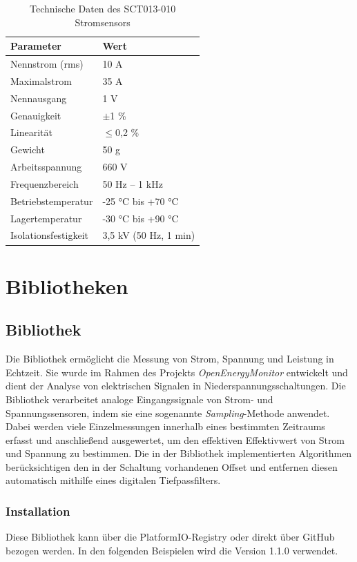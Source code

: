 \begin{table}[H]
	\centering
	\begin{tabular}{|l|l|}
		\hline
		\textbf{Parameter} & \textbf{Wert} \\
		\hline
		Nennstrom (rms) & 10 A \\
		\hline
		Maximalstrom & 35 A \\
		\hline
		Nennausgang & 1 V \\
		\hline
		Genauigkeit & $\pm$1 \% \\
		\hline
		Linearität & $\leq$0,2 \% \\
		\hline
		Gewicht & 50 g \\
		\hline
		Arbeitsspannung & 660 V \\
		\hline
		Frequenzbereich & 50 Hz – 1 kHz \\
		\hline
		Betriebstemperatur & -25 °C bis +70 °C \\
		\hline
		Lagertemperatur & -30 °C bis +90 °C \\
		\hline
		Isolationsfestigkeit & 3,5 kV (50 Hz, 1 min) \\
		\hline
	\end{tabular}
	\caption{Technische Daten des SCT013-010 Stromsensors \cite{YHDC:2017}}
	\label{tab:SCT013-Daten}
\end{table}


\section{Bibliotheken}
	\subsection{Bibliothek }
	Die Bibliothek  ermöglicht die Messung von Strom, Spannung und Leistung in Echtzeit. Sie wurde im Rahmen des Projekts \textit{OpenEnergyMonitor} entwickelt und dient der Analyse von elektrischen Signalen in Niederspannungsschaltungen. Die Bibliothek verarbeitet analoge Eingangssignale von Strom- und Spannungssensoren, indem sie eine sogenannte \textit{Sampling}-Methode anwendet. Dabei werden viele Einzelmessungen innerhalb eines bestimmten Zeitraums erfasst und anschlie{\ss}end ausgewertet, um den effektiven Effektivwert von Strom und Spannung zu bestimmen. Die in der Bibliothek implementierten Algorithmen berücksichtigen den in der Schaltung vorhandenen Offset und entfernen diesen automatisch mithilfe eines digitalen Tiefpassfilters. 
	
	
	\subsubsection{Installation}
	Diese Bibliothek kann über die PlatformIO-Registry \cite{OpenEnergyMonitor:2014PIO} oder direkt über GitHub \cite{OpenEnergyMonitor:2014GIT} bezogen werden. In den folgenden Beispielen wird die Version 1.1.0 verwendet.
	
